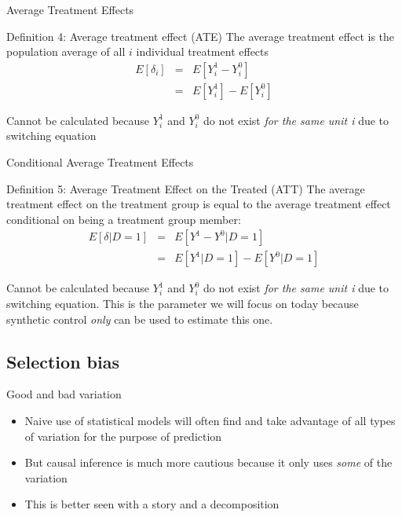 \documentclass{beamer}
\begin{document}
\begin{frame}{Average Treatment Effects}

  \begin{block}{Definition 4: Average treatment effect (ATE)}
    The average treatment effect is the population average of all $i$ individual treatment effects
    \begin{eqnarray*}
      E[\delta_i]&=&E[Y_i^1-Y_i^0]\\
      &=&E[Y^1_i] - E[Y^0_i]
    \end{eqnarray*}
  \end{block}

  \bigskip

  Cannot be calculated because $Y^1_i$ and $Y^0_i$ do not exist \emph{for the same unit i} due to switching equation



\end{frame}



\begin{frame}{Conditional Average Treatment Effects}


  \begin{block}{Definition 5: Average Treatment Effect on the Treated (ATT)}
    The average treatment effect on the treatment group is equal to the average treatment effect conditional on being a treatment group member:
    \begin{eqnarray*}
      E[\delta|D=1]&=&E[Y^1-Y^0|D=1] \nonumber \\
      &=&E[Y^1|D=1]-E[Y^0|D=1]
    \end{eqnarray*}
  \end{block}
  Cannot be calculated because $Y^1_i$ and $Y^0_i$ do not exist \emph{for the same unit i} due to switching equation. This is the parameter we will focus on today because synthetic control \emph{only} can be used to estimate this one.


\end{frame}


\subsection{Selection bias}

\begin{frame}{Good and bad variation}

  \begin{itemize}
    \item Naive use of statistical models will often find and take advantage of all types of variation for the purpose of prediction
    \item But causal inference is much more cautious because it only uses \emph{some} of the variation
    \item This is better seen with a story and a decomposition
  \end{itemize}

\end{frame}
\end{document}
